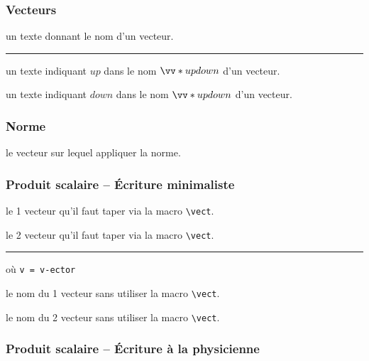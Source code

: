 \documentclass[12pt,a4paper]{article}
\newcommand\env[1]{\texttt{#1}}
\newcommand\macro[1]{\env{\textbackslash{}#1}}
\theoremstyle{definition}
\newcommand\separation{
	\medskip
	\hfill\rule{0.5\textwidth}{0.75pt}\hfill
	\medskip
}
\newcommand\extraspace{
	\vspace{0.25em}
}
\begin{document}


\extraspace


\subsubsection{Vecteurs}


\IDarg{} un texte donnant le nom d'un vecteur.


\separation



 un texte indiquant $up$ dans le nom $\vect*{up}{down}$ d'un vecteur.

 un texte indiquant $down$ dans le nom $\vect*{up}{down}$ d'un vecteur.
\subsubsection{Norme}



\IDarg{} le vecteur sur lequel appliquer la norme.
\subsubsection{Produit scalaire -- Écriture minimaliste}


 le 1\ier{} vecteur qu'il faut taper via la macro \macro{vect}.

 le 2\ieme{} vecteur qu'il faut taper via la macro \macro{vect}.


\separation


 où \quad \verb+v = v-ector+

 le nom du 1\ier{} vecteur sans utiliser la macro \macro{vect}.

 le nom du 2\ieme{} vecteur sans utiliser la macro \macro{vect}.





\subsubsection{Produit scalaire -- Écriture \og à la physicienne \fg}
\end{document}
